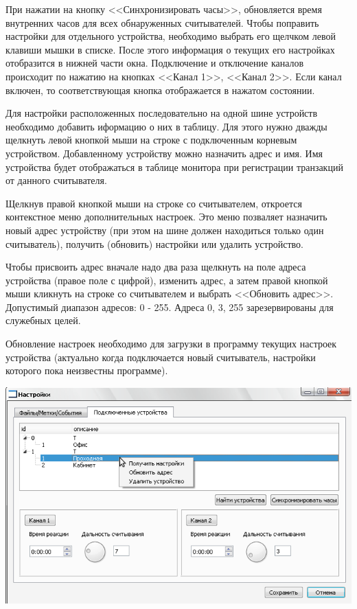 При нажатии на кнопку <<Синхронизировать часы>>, обновляется время внутренних часов для всех обнаруженных считывателей.
Чтобы поправить настройки для отдельного устройства, необходимо выбрать его щелчком левой клавиши мышки в списке.
После этого информация о текущих его настройках отобразится в нижней части окна. 
Подключение и отключение каналов происходит по нажатию на кнопках <<Канал 1>>, <<Канал 2>>.
Если канал включен, то соответствующая кнопка отображается в нажатом состоянии.

Для настройки расположенных последовательно на одной шине устройств необходимо добавить иформацию о них в таблицу. 
Для этого нужно дважды щелкнуть левой кнопкой мыши на строке с подключенным корневым устройством. Добавленному устройству
можно назначить адрес и имя. Имя устройства будет отображаться в таблице монитора при регистрации транзакций от данного считывателя.

Щелкнув правой кнопкой мыши на строке со считывателем, откроется контекстное меню дополнительных настроек. Это меню позваляет назначить новый
адрес устройству (при этом на шине должен находиться только один считыватель), получить (обновить) настройки или удалить устройство. 

Чтобы присвоить адрес вначале надо два раза щелкнуть на поле адреса устройства (правое поле с цифрой), изменить адрес, а затем правой кнопкой мыши кликнуть
на строке со считывателем и выбрать <<Обновить адрес>>. Допустимый диапазон адресов: 0 - 255. Адреса 0, 3, 255 зарезервированы для
служебных целей.

Обновление настроек необходимо для загрузки в программу текущих настроек устройства 
(актуально когда подключается новый считыватель, настройки которого пока неизвестны программе).

\begin{center}
    \includegraphics[scale=0.5]{img/settings_context.png}
\end{center}

